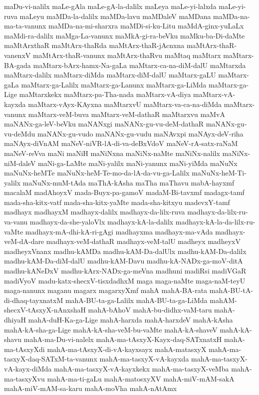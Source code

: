 {maDu-vi-nalilx
maLe-gAla
maLe-gA-la-dalilx
maLeya
maLe-yi-lalxda
maLe-yi-ruva
maLeyu
maMDa-la-dalilx
maMDa-lavu
maMDaleV
maMDana
maMDa-na-ma-ta-vanunx
maMDa-na-mi-sharxra
maMDi-si-ku-Litu
maMdA-ginx-yuLaLx
maMdi-ra-dalilx
maMga-La-vanunx
maMkA-gi-ra-beVku
maMku-ba-Di-daMte
maMtArxthaR
maMtArx-thaRda
maMtArx-thaR-jAcnxna
maMtArx-thaR-vanenxV
maMtArx-thaR-vanunx
maMtArx-thaRvu
maMtaq
maMtarx
maMtarx-BA-gada
maMtarx-bArx-hamx-Na-gaLa
maMtarx-ca-na-diM-dalU
maMtarxda
maMtarx-dalilx
maMtarx-diMda
maMtarx-diM-dalU
maMtarx-gaLU
maMtarx-gaLa
maMtarx-ga-Lalilx
maMtarx-ga-Lanunx
maMtarx-ga-LiMda
maMtarx-ga-Lige
maMtarxkekx
maMtarx-pa-Tha-nada
maMtarx-vA-diya
maMtarx-vA-kayxda
maMtarx-vAyx-KAyxna
maMtarxvU
maMtarx-va-ca-na-diMda
maMtarx-vanunx
maMtarx-veM-buva
maMtarx-veM-dathaR
maMtarxvu
maMvA
maNANx-ga-leV-beVku
maNANxgi
maNANx-gu-vu-deM-dathaR
maNANx-gu-vu-deMdu
maNANx-gu-vudo
maNANx-gu-vudu
maNAvxpi
maNAyx-deV-riha
maNAyx-diVnAM
maNeV-niVR-lA-di-va-deBxVdoV
maNeV-rA-satx-raNaM
maNeV-reVva
maNi
maNiH
maNiNxna
maNiNx-naMte
maNiNx-nalilx
maNiNx-niM-daleV
maNi-ga-LaMte
maNi-yalilx
maNi-yanunx
maNi-yiMda
maNuNx
maNuNx-heMTe
maNuNx-heM-Te-mo-da-lA-da-vu-ga-Lalilx
maNuNx-heM-Ti-yalilx
maNuNx-muM-tAda
maThA-kAsha
maTha
maThavu
mabA-hayxmf
macalaM
madAhoyxV
mada-Buyx-pa-gamoV
madaM-Bi-tavxmf
madagx-tamf
mada-sha-kitx-vatf
mada-sha-kitx-yaMte
mada-sha-kitxyu
madevxY-tamf
madhayx
madhayxM
madhayx-dalilx
madhayx-da-lilx-ruva
madhayx-da-lilx-ru-va-vanu
madhayx-da-she-yaloVlx
madhayx-kA-la-dalilx
madhayx-kA-la-da-lilx-ru-vaMte
madhayx-mA-dhi-kA-ri-gAgi
madhayxma
madhayx-ma-vAda
madhayx-veM-dA-dare
madhayx-veM-dathaR
madhayx-veM-talU
madheyx
madheyxV
madheyxVnanx
madhu-kAMDa
madhu-kAM-Da-dalUlx
madhu-kAM-Da-dalilx
madhu-kAM-Da-diM-dalU
madhu-kAM-Davu
madhu-kA-NADx-ga-moV-ditA
madhu-kANeDxV
madhu-kArx-NADx-ga-meVna
madhuni
madiRsi
madiVGaR
madiVyoV
madu-katx-shecxV-tisxdadhxM
maga
maga-naMte
maga-naM-teyU
maga-nanunx
maganu
magarx
magarxyXmf
mahA
mahA-BA-rata
mahA-BU-tA-di-dhaq-tayxnatxM
mahA-BU-ta-ga-Lalilx
mahA-BU-ta-ga-LiMda
mahAM-shecxV-tAsxyX-nAnxshaH
mahA-bAhoV
mahA-bu-didhx-vaM-taru
mahA-dhiyaH
mahA-duH-Ka-ga-Lige
mahA-harxda
mahA-harxdeV
mahA-kAsha
mahA-kA-sha-ga-Lige
mahA-kA-sha-veM-bu-vaMte
mahA-kA-shaveV
mahA-kA-shavu
mahA-ma-Du-vi-nalelx
mahA-ma-tAsxyX-Kayx-daq-SATxnatxH
mahA-ma-tAsxyXdi
mahA-ma-tAsxyX-di-vA-kayxsayx
mahA-matasxyX
mahA-ma-tasxyX-daq-SATxM-ta-vanunx
mahA-ma-tasxyX-vA-kayxda
mahA-ma-tasxyX-vA-kayx-diMda
mahA-ma-tasxyX-vA-kayxkekx
mahA-ma-tasxyX-veMba
mahA-ma-tasxyXvu
mahA-ma-ti-gaLu
mahA-matosxyXV
mahA-miV-mAM-sakA
mahA-miV-mAM-sa-karu
mahA-moVha
mahA-nAtAmx
}
